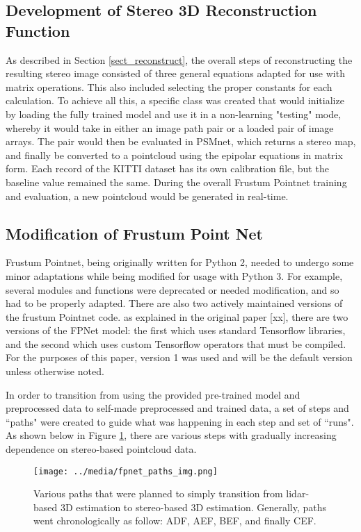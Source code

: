 \subsection{Development of Stereo 3D Reconstruction Function}
As described in Section \ref{sect_reconstruct}, the overall steps of reconstructing the resulting stereo image consisted of three general equations adapted for use with matrix operations. This also included selecting the proper constants for each calculation. To achieve all this, a specific class was created that would initialize by loading the fully trained model and use it in a non-learning "testing" mode, whereby it would take in either an image path pair or a loaded pair of image arrays. The pair would then be evaluated in PSMnet, which returns a stereo map, and finally be converted to a pointcloud using the epipolar equations in matrix form. Each record of the KITTI dataset has its own calibration file, but the baseline value remained the same. During the overall Frustum Pointnet training and evaluation, a new pointcloud would be generated in real-time.

\subsection{Modification of Frustum Point Net}
Frustum Pointnet, being originally written for Python 2, needed to undergo some minor adaptations while being modified for usage with Python 3. For example, several modules and functions were deprecated or needed modification, and so had to be properly adapted. There are also two actively maintained versions of the frustum Pointnet code. as explained in the original paper [xx], there are two versions of the FPNet model: the first which uses standard Tensorflow libraries, and the second which uses custom Tensorflow operators that must be compiled. For the purposes of this paper, version 1 was used and will be the default version unless otherwise noted.

In order to transition from using the provided pre-trained model and preprocessed data to self-made preprocessed and trained data, a set of steps and ``paths" were created to guide what was happening in each step and set of ``runs". As shown below in Figure \ref{fp_paths}, there are various steps with gradually increasing dependence on stereo-based pointcloud data.

\begin{figure}[h] %
    \texttt{[image: ../media/fpnet\_paths\_img.png]}
    \caption{Various paths that were planned to simply transition from lidar-based 3D estimation to stereo-based 3D estimation. Generally, paths went chronologically as follow: ADF, AEF, BEF, and finally CEF.}
    \label{fp_paths} %
\end{figure}

